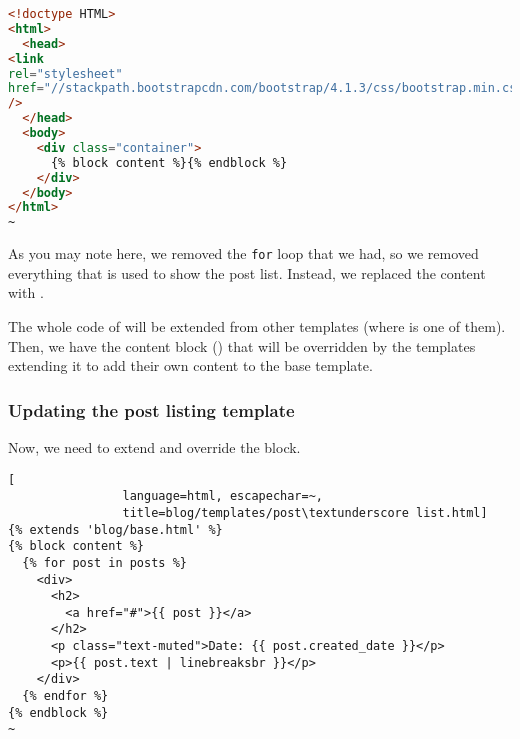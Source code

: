             \begin{lstlisting}[language=html, escapechar=~, title=blog/templates/base.html]
<!doctype HTML>
<html>
  <head>
<link
rel="stylesheet"
href="//stackpath.bootstrapcdn.com/bootstrap/4.1.3/css/bootstrap.min.css"
/>
  </head>
  <body>
    <div class="container">
      {% block content %}{% endblock %}
    </div>
  </body>
</html>
~
            \end{lstlisting}
            
            As you may note here, we removed the \texttt{for} loop that we had,
            so we removed everything that is used to show the post list. Instead,
            we replaced the content with .
            
            The whole code of  will be extended from other templates
            (where  is one of them). Then, we have
            the content block ()
            that will be overridden by the templates extending it to add their own content 
            to the base template.
            
        \subsubsection{Updating the post listing template}
            Now, we need to extend  and override the  block.
            
            \begin{lstlisting}[
                language=html, escapechar=~, 
                title=blog/templates/post\textunderscore list.html]
{% extends 'blog/base.html' %}
{% block content %}
  {% for post in posts %}
    <div>
      <h2>
        <a href="#">{{ post }}</a>
      </h2>
      <p class="text-muted">Date: {{ post.created_date }}</p>
      <p>{{ post.text | linebreaksbr }}</p>
    </div>
  {% endfor %}
{% endblock %}
~
            \end{lstlisting}
